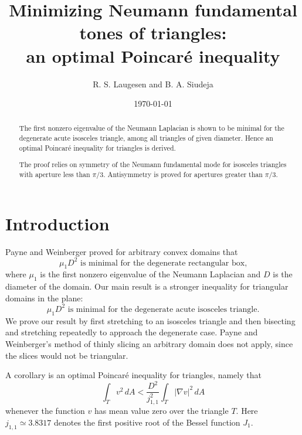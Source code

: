 \documentclass[11pt,reqno]{amsart}
\numberwithin{equation}{section}
\begin{document}
\title[]{Minimizing Neumann fundamental tones of triangles: \\
an optimal Poincar\'{e} inequality}

\author[]{R. S. Laugesen and B. A. Siudeja}
\address{Department of Mathematics, University of Illinois, Urbana,
IL 61801, U.S.A.} 
\date{\today}


\begin{abstract}
The first nonzero eigenvalue of the Neumann Laplacian is shown to
be minimal for the degenerate acute isosceles triangle, among all
triangles of given diameter. Hence an optimal Poincar\'{e} inequality for triangles is derived.

The proof relies on symmetry of the Neumann fundamental mode for isosceles
triangles with aperture less than $\pi/3$. Antisymmetry is proved
for apertures greater than $\pi/3$.
\end{abstract}

\maketitle

\section{\bf Introduction}

Payne and Weinberger \cite{PW60} proved for arbitrary convex
domains that
\[
\text{$\mu_1 D^2$ is minimal for the degenerate rectangular box,}
\]
where $\mu_1$ is the first nonzero eigenvalue of the Neumann
Laplacian and $D$ is the diameter of the domain. Our main result is a stronger inequality for triangular domains in the plane:
\[
\text{$\mu_1 D^2$ is minimal for the degenerate acute isosceles
triangle.}
\]
We prove our result by first stretching to an isosceles triangle and then
bisecting and stretching repeatedly to approach the degenerate
case. Payne and Weinberger's method of thinly slicing an arbitrary
domain does not apply, since the slices would not be triangular.

A corollary is an optimal Poincar\'{e} inequality for triangles, namely that
\[
\int_T v^2 \, dA < \frac{D^2}{j_{1,1}^2} \int_T |\nabla v|^2 \, dA
\]
whenever the function $v$ has mean value zero over the triangle
$T$. Here $j_{1,1} \simeq 3.8317$ denotes the first positive root of the Bessel function $J_1$.
\end{document}
